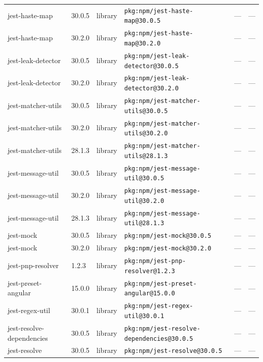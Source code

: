 \documentclass[11pt,a4paper]{article}
\begin{document}
\begin{longtable}{|p{4cm}|p{2cm}|p{1.6cm}|p{5cm}|p{1.5cm}|p{3.5cm}|}
\raggedright jest-haste-map & 30.0.5 & library & \small\texttt{pkg:npm/jest-haste-map@30.0.5} & — & \small — \\
\raggedright jest-haste-map & 30.2.0 & library & \small\texttt{pkg:npm/jest-haste-map@30.2.0} & — & \small — \\
\raggedright jest-leak-detector & 30.0.5 & library & \small\texttt{pkg:npm/jest-leak-detector@30.0.5} & — & \small — \\
\raggedright jest-leak-detector & 30.2.0 & library & \small\texttt{pkg:npm/jest-leak-detector@30.2.0} & — & \small — \\
\raggedright jest-matcher-utils & 30.0.5 & library & \small\texttt{pkg:npm/jest-matcher-utils@30.0.5} & — & \small — \\
\raggedright jest-matcher-utils & 30.2.0 & library & \small\texttt{pkg:npm/jest-matcher-utils@30.2.0} & — & \small — \\
\raggedright jest-matcher-utils & 28.1.3 & library & \small\texttt{pkg:npm/jest-matcher-utils@28.1.3} & — & \small — \\
\raggedright jest-message-util & 30.0.5 & library & \small\texttt{pkg:npm/jest-message-util@30.0.5} & — & \small — \\
\raggedright jest-message-util & 30.2.0 & library & \small\texttt{pkg:npm/jest-message-util@30.2.0} & — & \small — \\
\raggedright jest-message-util & 28.1.3 & library & \small\texttt{pkg:npm/jest-message-util@28.1.3} & — & \small — \\
\raggedright jest-mock & 30.0.5 & library & \small\texttt{pkg:npm/jest-mock@30.0.5} & — & \small — \\
\raggedright jest-mock & 30.2.0 & library & \small\texttt{pkg:npm/jest-mock@30.2.0} & — & \small — \\
\raggedright jest-pnp-resolver & 1.2.3 & library & \small\texttt{pkg:npm/jest-pnp-resolver@1.2.3} & — & \small — \\
\raggedright jest-preset-angular & 15.0.0 & library & \small\texttt{pkg:npm/jest-preset-angular@15.0.0} & — & \small — \\
\raggedright jest-regex-util & 30.0.1 & library & \small\texttt{pkg:npm/jest-regex-util@30.0.1} & — & \small — \\
\raggedright jest-resolve-dependencies & 30.0.5 & library & \small\texttt{pkg:npm/jest-resolve-dependencies@30.0.5} & — & \small — \\
\raggedright jest-resolve & 30.0.5 & library & \small\texttt{pkg:npm/jest-resolve@30.0.5} & — & \small — \\

\end{longtable}
\end{document}
